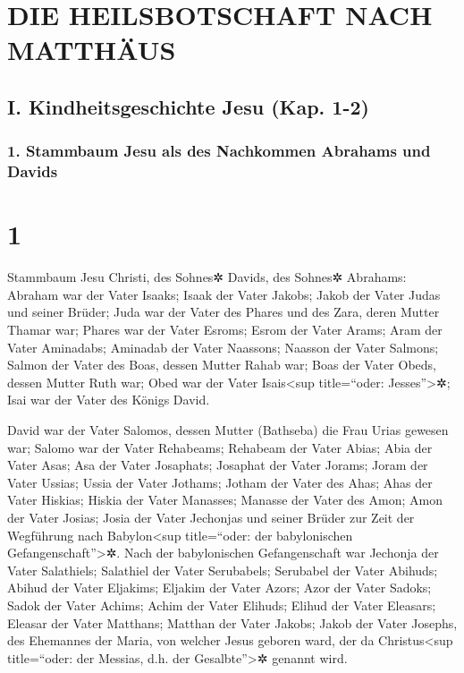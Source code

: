 \hypertarget{die-heilsbotschaft-nach-matthuxe4us}{%
\section{DIE HEILSBOTSCHAFT NACH
MATTHÄUS}\label{die-heilsbotschaft-nach-matthuxe4us}}

\hypertarget{i.-kindheitsgeschichte-jesu-kap.-1-2}{%
\subsection{I. Kindheitsgeschichte Jesu (Kap.
1-2)}\label{i.-kindheitsgeschichte-jesu-kap.-1-2}}

\hypertarget{stammbaum-jesu-als-des-nachkommen-abrahams-und-davids}{%
\subsubsection{1. Stammbaum Jesu als des Nachkommen Abrahams und
Davids}\label{stammbaum-jesu-als-des-nachkommen-abrahams-und-davids}}

\hypertarget{section}{%
\section{1}\label{section}}

 Stammbaum Jesu Christi, des Sohnes✲ Davids, des Sohnes✲
Abrahams:  Abraham war der Vater Isaaks; Isaak der Vater
Jakobs; Jakob der Vater Judas und seiner Brüder;  Juda war
der Vater des Phares und des Zara, deren Mutter Thamar war; Phares war
der Vater Esroms; Esrom der Vater Arams;  Aram der Vater
Aminadabs; Aminadab der Vater Naassons; Naasson der Vater Salmons;
 Salmon der Vater des Boas, dessen Mutter Rahab war; Boas
der Vater Obeds, dessen Mutter Ruth war; Obed war der Vater
Isais\textless sup title=``oder: Jesses''\textgreater✲; 
Isai war der Vater des Königs David.

David war der Vater Salomos, dessen Mutter (Bathseba) die Frau Urias
gewesen war;  Salomo war der Vater Rehabeams; Rehabeam der
Vater Abias; Abia der Vater Asas;  Asa der Vater
Josaphats; Josaphat der Vater Jorams; Joram der Vater Ussias;
 Ussia der Vater Jothams; Jotham der Vater des Ahas; Ahas
der Vater Hiskias;  Hiskia der Vater Manasses; Manasse
der Vater des Amon; Amon der Vater Josias;  Josia der
Vater Jechonjas und seiner Brüder zur Zeit der Wegführung nach
Babylon\textless sup title=``oder: der babylonischen
Gefangenschaft''\textgreater✲.  Nach der babylonischen
Gefangenschaft war Jechonja der Vater Salathiels; Salathiel der Vater
Serubabels;  Serubabel der Vater Abihuds; Abihud der
Vater Eljakims; Eljakim der Vater Azors;  Azor der Vater
Sadoks; Sadok der Vater Achims; Achim der Vater Elihuds; 
Elihud der Vater Eleasars; Eleasar der Vater Matthans; Matthan der Vater
Jakobs;  Jakob der Vater Josephs, des Ehemannes der
Maria, von welcher Jesus geboren ward, der da Christus\textless sup
title=``oder: der Messias, d.h. der Gesalbte''\textgreater✲ genannt
wird.

